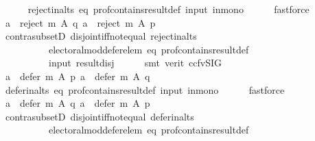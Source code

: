 \begin{isabellebody}
\ \ \ \ \isamarkupfalse%
\ reject{\isacharunderscore}{\kern0pt}in{\isacharunderscore}{\kern0pt}alts\ eq\ prof{\isacharunderscore}{\kern0pt}contains{\isacharunderscore}{\kern0pt}result{\isacharunderscore}{\kern0pt}def\ input\ in{\isacharunderscore}{\kern0pt}mono\isanewline
\ \ \ \ \isamarkupfalse%
\ fastforce\isanewline
\ \ \isamarkupfalse%
\ \isamarkupfalse%
\ {\isachardoublequoteopen}{\isasymforall}a\ {\isasymin}\ reject\ m\ A\ q{\isachardot}{\kern0pt}\ a\ {\isasymin}\ reject\ m\ A\ p{\isachardoublequoteclose}\isanewline
\ \ \ \ \isamarkupfalse%
\ contra{\isacharunderscore}{\kern0pt}subsetD\ disjoint{\isacharunderscore}{\kern0pt}iff{\isacharunderscore}{\kern0pt}not{\isacharunderscore}{\kern0pt}equal\ reject{\isacharunderscore}{\kern0pt}in{\isacharunderscore}{\kern0pt}alts\isanewline
\ \ \ \ \ \ \ \ \ \ electoral{\isacharunderscore}{\kern0pt}mod{\isacharunderscore}{\kern0pt}defer{\isacharunderscore}{\kern0pt}elem\ eq\ prof{\isacharunderscore}{\kern0pt}contains{\isacharunderscore}{\kern0pt}result{\isacharunderscore}{\kern0pt}def\isanewline
\ \ \ \ \ \ \ \ \ \ input\ result{\isacharunderscore}{\kern0pt}disj\isanewline
\ \ \ \ \isamarkupfalse%
\ {\isacharparenleft}{\kern0pt}smt\ {\isacharparenleft}{\kern0pt}verit{\isacharcomma}{\kern0pt}\ ccfv{\isacharunderscore}{\kern0pt}SIG{\isacharparenright}{\kern0pt}{\isacharparenright}{\kern0pt}\isanewline
\ \ \isamarkupfalse%
\ \isamarkupfalse%
\ {\isachardoublequoteopen}{\isasymforall}a\ {\isasymin}\ defer\ m\ A\ p{\isachardot}{\kern0pt}\ a\ {\isasymin}\ defer\ m\ A\ q{\isachardoublequoteclose}\isanewline
\ \ \ \ \isamarkupfalse%
\ defer{\isacharunderscore}{\kern0pt}in{\isacharunderscore}{\kern0pt}alts\ eq\ prof{\isacharunderscore}{\kern0pt}contains{\isacharunderscore}{\kern0pt}result{\isacharunderscore}{\kern0pt}def\ input\ in{\isacharunderscore}{\kern0pt}mono\isanewline
\ \ \ \ \isamarkupfalse%
\ fastforce\isanewline
\ \ \isamarkupfalse%
\ \isamarkupfalse%
\ {\isachardoublequoteopen}{\isasymforall}a\ {\isasymin}\ defer\ m\ A\ q{\isachardot}{\kern0pt}\ a\ {\isasymin}\ defer\ m\ A\ p{\isachardoublequoteclose}\isanewline
\ \ \ \ \isamarkupfalse%
\ contra{\isacharunderscore}{\kern0pt}subsetD\ disjoint{\isacharunderscore}{\kern0pt}iff{\isacharunderscore}{\kern0pt}not{\isacharunderscore}{\kern0pt}equal\ defer{\isacharunderscore}{\kern0pt}in{\isacharunderscore}{\kern0pt}alts\isanewline
\ \ \ \ \ \ \ \ \ \ electoral{\isacharunderscore}{\kern0pt}mod{\isacharunderscore}{\kern0pt}defer{\isacharunderscore}{\kern0pt}elem\ eq\ prof{\isacharunderscore}{\kern0pt}contains{\isacharunderscore}{\kern0pt}result{\isacharunderscore}{\kern0pt}def\isanewline

\end{isabellebody}
